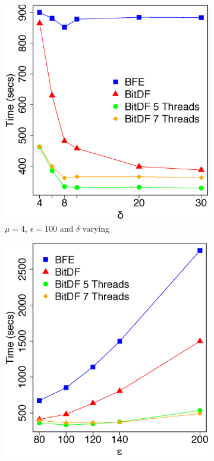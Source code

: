 {\begin{figure}[h!]
    \centering
    \begin{subfigure}[t]{0.49\textwidth}
        \includegraphics[width=\textwidth]{images/BerlinMOD_complete_varying_l.eps}
        \caption{$\mu = 4$, $\epsilon = 100$ and $\delta$ varying}
        \label{fig:berlinmod_complete_vary_l}
    \end{subfigure}
    \begin{subfigure}[t]{0.49\textwidth}
        \includegraphics[width=\textwidth]{images/BerlinMOD_complete_varying_g.eps}

\end{subfigure}
\end{figure}}
